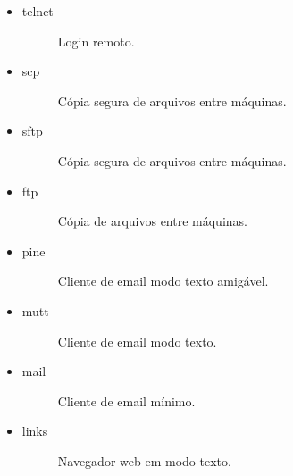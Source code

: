 \documentclass[a4paper,10pt,brazil]{sphinxmanual}
\begin{document}
\begin{itemize}
\begin{description}
\end{description}

\item {} \begin{description}
\item[{telnet}] \leavevmode
Login remoto.

\end{description}

\item {} \begin{description}
\item[{scp}] \leavevmode
Cópia segura de arquivos entre máquinas.

\end{description}

\item {} \begin{description}
\item[{sftp}] \leavevmode
Cópia segura de arquivos entre máquinas.

\end{description}

\item {} \begin{description}
\item[{ftp}] \leavevmode
Cópia de arquivos entre máquinas.

\end{description}

\item {} \begin{description}
\item[{pine}] \leavevmode
Cliente de email modo texto amigável.

\end{description}

\item {} \begin{description}
\item[{mutt}] \leavevmode
Cliente de email modo texto.

\end{description}

\item {} \begin{description}
\item[{mail}] \leavevmode
Cliente de email mínimo.

\end{description}

\item {} \begin{description}
\item[{links}] \leavevmode
Navegador web em modo texto.


\end{description}
\end{itemize}
\end{document}
